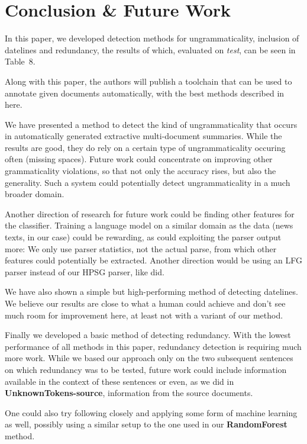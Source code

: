 \documentclass[a4paper,10pt]{scrartcl}
\theoremstyle{style}
\begin{document}
\newpage
\section{Conclusion \& Future Work}
\label{conclusion}

In this paper, we developed detection methods for ungrammaticality, inclusion of datelines and redundancy, the results of which, evaluated on \textit{test}, can be seen in Table~8.

Along with this paper, the authors will publish a toolchain that can be used to annotate given documents automatically, with the best methods described in here.

We have presented a method to detect the kind of ungrammaticality that occurs in automatically generated extractive multi-document summaries. While the results are good, they do rely on a certain type of ungrammaticality occuring often (missing spaces). Future work could concentrate on improving other grammaticality violations, so that not only the accuracy rises, but also the generality. Such a system could potentially detect ungrammaticality in a much broader domain.

Another direction of research for future work could be finding other features for the classifier. Training a language model on a similar domain as the data (news texts, in our case) could be rewarding, as could exploiting the parser output more: We only use parser statistics, not the actual parse, from which other features could potentially be extracted. Another direction would be using an LFG parser instead of our HPSG parser, like \cite{wagner2007comparative} did.

We have also shown a simple but high-performing method of detecting datelines. We believe our results are close to what a human could achieve and don't see much room for improvement here, at least not with a variant of our method.

Finally we developed a basic method of detecting redundancy. With the lowest performance of all methods in this paper, redundancy detection is requiring much more work. While we based our approach only on the two subsequent sentences on which redundancy was to be tested, future work could include information available in the context of these sentences or even, as we did in \textbf{UnknownTokens-source}, information from the source documents.

One could also try following \cite{hatzivassiloglou1999detecting} closely and applying some form of machine learning as well, possibly using a similar setup to the one used in our \textbf{RandomForest} method.
\end{document}
